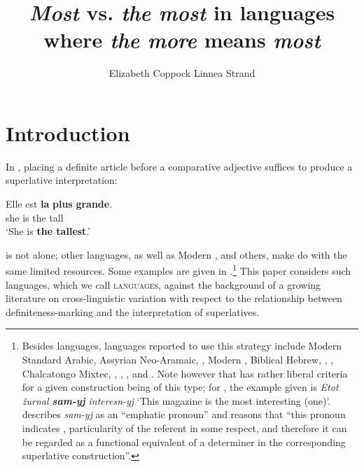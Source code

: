 \documentclass[output=paper
,modfonts
,nonflat]{langsci/langscibook}
\title{\texorpdfstring{\textit{Most} vs. \textit{the most} in languages where \textit{the more} means \textit{most}}{`{Most}' vs. `{the most}' in languages where `{the more}' means `{most}'}}
\author{%
 Elizabeth Coppock\affiliation{Boston University \\ University of Gothenburg}\lastand 
 Linnea Strand\affiliation{University of Gothenburg}
}
\begin{document}

\maketitle
\section{Introduction} 
In , placing a definite article before a comparative adjective suffices to produce a superlative interpretation:

\ea \label{ex:coppockstrand:1}
\gll Elle est \textbf{la} \textbf{plus} \textbf{grande}.\\
she is the \cmpr{} tall\\ 
\glt `She is \textbf{the tallest}.' 
\z

 is not alone; other  languages, as well as Modern ,  and others, make do with the same limited resources. Some examples are given in .\footnote{Besides  languages, languages reported to use this strategy include 
Modern Standard Arabic, Assyrian Neo-Aramaic, , Modern , Biblical Hebrew, , , Chalcatongo Mixtec, , , , and  \citep{Bobaljik2012,Gorshenin2012}. Note however that \citeauthor{Gorshenin2012} has rather liberal criteria for a given construction being of this type; for , the example given is \textit{Etot \v{z}urnal \textbf{sam-yj} interesn-yj} `This magazine is the most interesting (one)'. \citet[129]{Gorshenin2012} describes \textit{sam-yj} as an ``emphatic pronoun'' and reasons that ``this pronoun indicates , particularity of the referent in some respect, and therefore it can be regarded as a functional equivalent of a determiner in the corresponding superlative construction''.} This paper considers such languages, which we call  \textsc{languages}, against the background of a growing literature on cross-linguistic variation with respect to the relationship between definiteness-marking and the interpretation of superlatives.
\end{document}
